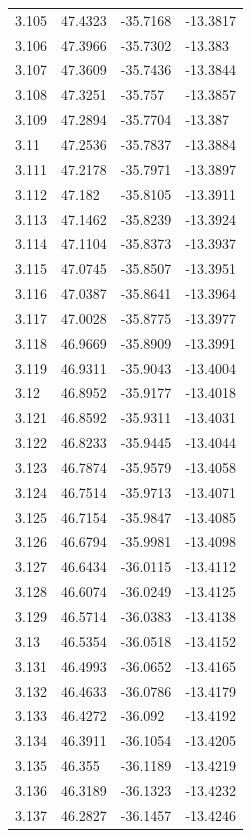 \begin{tabular}{llll}
3.105 & 47.4323 & -35.7168 & -13.3817 \\
3.106 & 47.3966 & -35.7302 & -13.383 \\
3.107 & 47.3609 & -35.7436 & -13.3844 \\
3.108 & 47.3251 & -35.757 & -13.3857 \\
3.109 & 47.2894 & -35.7704 & -13.387 \\
3.11 & 47.2536 & -35.7837 & -13.3884 \\
3.111 & 47.2178 & -35.7971 & -13.3897 \\
3.112 & 47.182 & -35.8105 & -13.3911 \\
3.113 & 47.1462 & -35.8239 & -13.3924 \\
3.114 & 47.1104 & -35.8373 & -13.3937 \\
3.115 & 47.0745 & -35.8507 & -13.3951 \\
3.116 & 47.0387 & -35.8641 & -13.3964 \\
3.117 & 47.0028 & -35.8775 & -13.3977 \\
3.118 & 46.9669 & -35.8909 & -13.3991 \\
3.119 & 46.9311 & -35.9043 & -13.4004 \\
3.12 & 46.8952 & -35.9177 & -13.4018 \\
3.121 & 46.8592 & -35.9311 & -13.4031 \\
3.122 & 46.8233 & -35.9445 & -13.4044 \\
3.123 & 46.7874 & -35.9579 & -13.4058 \\
3.124 & 46.7514 & -35.9713 & -13.4071 \\
3.125 & 46.7154 & -35.9847 & -13.4085 \\
3.126 & 46.6794 & -35.9981 & -13.4098 \\
3.127 & 46.6434 & -36.0115 & -13.4112 \\
3.128 & 46.6074 & -36.0249 & -13.4125 \\
3.129 & 46.5714 & -36.0383 & -13.4138 \\
3.13 & 46.5354 & -36.0518 & -13.4152 \\
3.131 & 46.4993 & -36.0652 & -13.4165 \\
3.132 & 46.4633 & -36.0786 & -13.4179 \\
3.133 & 46.4272 & -36.092 & -13.4192 \\
3.134 & 46.3911 & -36.1054 & -13.4205 \\
3.135 & 46.355 & -36.1189 & -13.4219 \\
3.136 & 46.3189 & -36.1323 & -13.4232 \\
3.137 & 46.2827 & -36.1457 & -13.4246 \\

\end{tabular}
